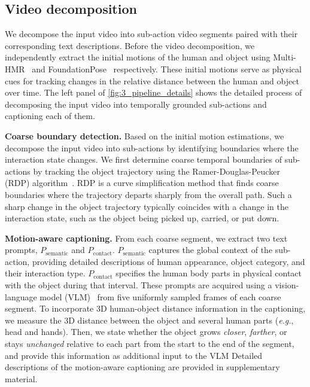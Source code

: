 


\subsection{Video decomposition}
\label{sec:3.2_decomposition}
We decompose the input video into sub-action video segments paired with their corresponding text descriptions.
Before the video decomposition, we independently extract the initial motions of the human and object using Multi-HMR~\cite{baradel2024multi} and FoundationPose~\cite{wen2024foundationpose} respectively.
These initial motions serve as physical cues for tracking changes in the relative distance between the human and object over time.
The left panel of \cref{fig:3_pipeline_details} shows the detailed process of decomposing the input video into temporally grounded sub-actions and captioning each of them.


\noindent\textbf{Coarse boundary detection.}
Based on the initial motion estimations, we decompose the input video into sub-actions by identifying boundaries where the interaction state changes.
We first determine coarse temporal boundaries of sub-actions by tracking the object trajectory using the Ramer-Douglas-Peucker (RDP) algorithm~\cite{douglas1973algorithms}.
RDP is a curve simplification method that finds coarse boundaries where the trajectory departs sharply from the overall path.
Such a sharp change in the object trajectory typically coincides with a change in the interaction state, such as the object being picked up, carried, or put down.


\noindent\textbf{Motion-aware captioning.}
From each coarse segment, we extract two text prompts, $P_{\text{semantic}}$ and $P_{\text{contact}}$.
$P_{\text{semantic}}$ captures the global context of the sub-action, providing detailed descriptions of human appearance, object category, and their interaction type.
$P_{\text{contact}}$ specifies the human body parts in physical contact with the object during that interval.
These prompts are acquired using a vision-language model (VLM)~\cite{openai2026gpt5} from five uniformly sampled frames of each coarse segment.
To incorporate 3D human-object distance information in the captioning, we measure the 3D distance between the object and several human parts (\textit{e.g.}, head and hands).
Then, we state whether the object grows \textit{closer}, \textit{farther}, or stays \textit{unchanged} relative to each part from the start to the end of the segment, and provide this information as additional input to the VLM
Detailed descriptions of the motion-aware captioning are provided in supplementary material.


